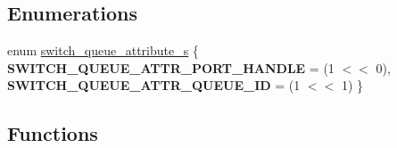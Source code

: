 \subsection*{Enumerations}
\begin{DoxyCompactItemize}
\item 
enum \hyperlink{group__QUEUE_ga52bffabee8ef791c8e3e0c1dd1bdd0cb}{switch\+\_\+queue\+\_\+attribute\+\_\+s} \{ {\bfseries S\+W\+I\+T\+C\+H\+\_\+\+Q\+U\+E\+U\+E\+\_\+\+A\+T\+T\+R\+\_\+\+P\+O\+R\+T\+\_\+\+H\+A\+N\+D\+L\+E} = (1 $<$$<$ 0), 
{\bfseries S\+W\+I\+T\+C\+H\+\_\+\+Q\+U\+E\+U\+E\+\_\+\+A\+T\+T\+R\+\_\+\+Q\+U\+E\+U\+E\+\_\+\+I\+D} = (1 $<$$<$ 1)
 \}
\end{DoxyCompactItemize}
\subsection*{Functions}
